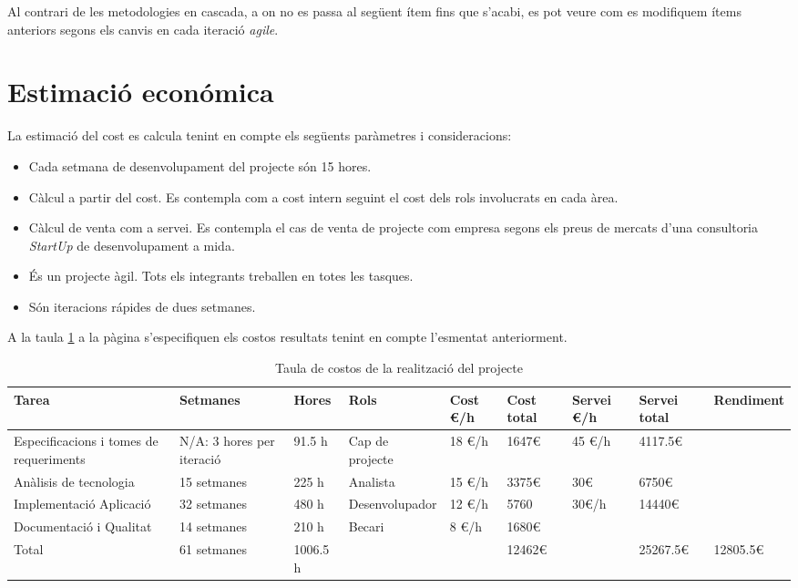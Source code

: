 Al contrari de les metodologies en cascada, a on no es passa al següent ítem fins que s'acabi, es pot veure com es modifiquem ítems anteriors segons els canvis en cada iteració \textit{agile}.

\section{Estimaci\'{o} econ\'{o}mica}
La estimació del cost es calcula tenint en compte els següents paràmetres i consideracions:
\begin{itemize}
\item Cada setmana de desenvolupament del projecte s\'{o}n 15 hores.
\item C\`{a}lcul a partir del cost. Es contempla com a cost intern seguint el cost dels rols involucrats en cada àrea.
\item C\`{a}lcul de venta com a servei. Es contempla el cas de venta de projecte com empresa segons els preus de mercats d'una consultoria \textit{StartUp} de desenvolupament a mida.
\item \'{E}s un projecte àgil. Tots els integrants treballen en totes les tasques.
\item S\'{o}n iteracions r\'{a}pides de dues setmanes.
\end{itemize}

A la taula \ref{costs} a la p\`{a}gina \pageref{costs} s'especifiquen els costos resultats tenint en compte l'esmentat anteriorment.

\begin{table}
\begin{tabular}{|p{2.75cm}|p{2cm}|p{1cm}|p{3cm}|p{1cm}|p{2cm}|p{2cm}|p{2cm}|p{1.75cm}|}
\hline
Tarea & Setmanes & Hores & Rols & Cost \euro/h & Cost total & Servei \euro/h & Servei total & Rendiment \\ \hline
Especificacions i tomes de requeriments & N/A: 3 hores per iteració & 91.5 h & Cap de projecte & 18 \euro/h & 1647\euro & 45 \euro/h & 4117.5\euro & \\ \hline
Anàlisis de tecnologia & 15 setmanes & 225 h & Analista & 15 \euro/h & 3375\euro & 30\euro & 6750\euro & \\ \hline
Implementació Aplicació & 32 setmanes & 480 h & Desenvolupador & 12 \euro/h & 5760 & 30\euro/h & 14440\euro & \\ \hline
Documentació i Qualitat & 14 setmanes & 210 h & Becari & 8 \euro/h & 1680\euro & & & \\ \hline 
\hline
Total & 61 setmanes & 1006.5 h & & & 12462\euro & & 25267.5\euro & 12805.5\euro \\ \hline
\end{tabular}
\caption{Taula de costos de la realització del projecte}
\label{costs}
\end{table}


